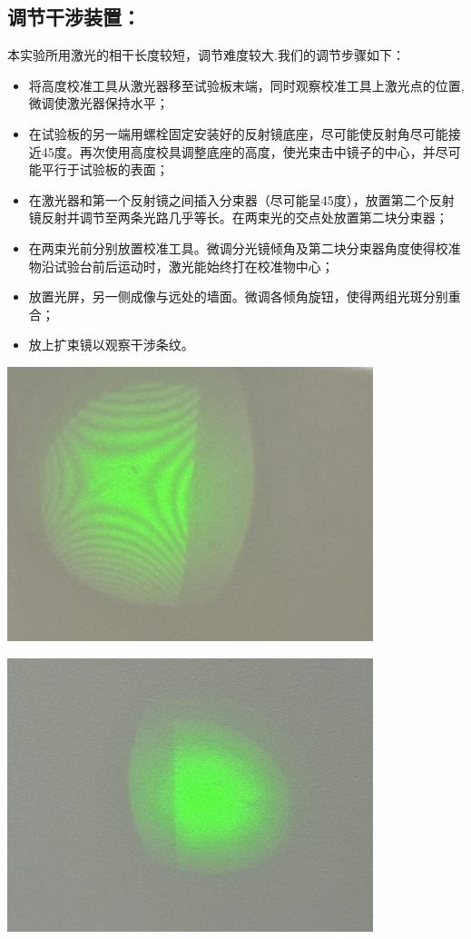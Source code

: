 \documentclass[10pt]{ctexart}
\begin{document}
\subsection{调节干涉装置：}
本实验所用激光的相干长度较短，调节难度较大.我们的调节步骤如下：
\begin{itemize}
\item 将高度校准工具从激光器移至试验板末端，同时观察校准工具上激光点的位置,微调使激光器保持水平；
\item 在试验板的另一端用螺栓固定安装好的反射镜底座，尽可能使反射角尽可能接近45度。再次使用高度校具调整底座的高度，使光束击中镜子的中心，并尽可能平行于试验板的表面；
\item 在激光器和第一个反射镜之间插入分束器（尽可能呈45度），放置第二个反射镜反射并调节至两条光路几乎等长。在两束光的交点处放置第二块分束器；
\item 在两束光前分别放置校准工具。微调分光镜倾角及第二块分束器角度使得校准物沿试验台前后运动时，激光能始终打在校准物中心；
\item 放置光屏，另一侧成像与远处的墙面。微调各倾角旋钮，使得两组光斑分别重合；
\item 放上扩束镜以观察干涉条纹。
\end{itemize}
\begin{minipage}{\textwidth} 
    \includegraphics[width=0.8\textwidth]{不加任何偏振片.jpg}
\end{minipage}
\begin{minipage}{\textwidth} 
    \includegraphics[width=0.8\textwidth]{两边加入偏振方向相互垂直的偏振片后的图像.jpg}
\end{minipage}
\end{document}
